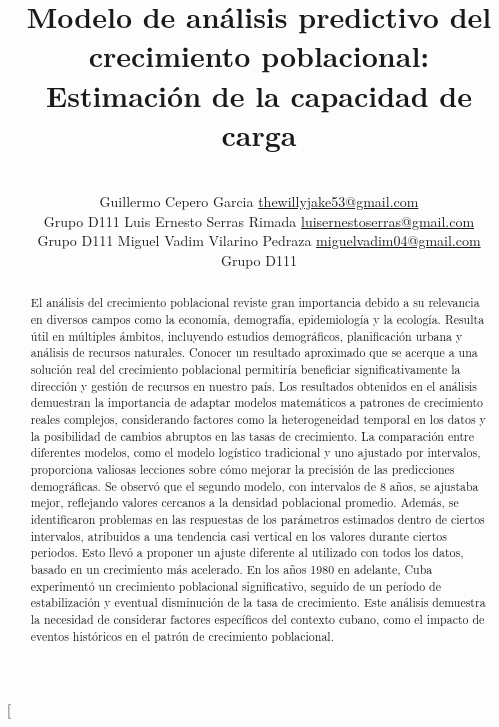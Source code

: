 \documentclass[a4paper,10pt,twocolumn]{article}
\title{Modelo de análisis predictivo del crecimiento poblacional: Estimación de la capacidad de carga}
\author{\\
\name Guillermo Cepero Garcia \email \href{mailto:thewillyjake53@gmail.com}{thewillyjake53@gmail.com}
	\\ \addr Grupo D111 \AND
\name Luis Ernesto Serras Rimada \email \href{mailto:luisernestoserras@gmail.com}{luisernestoserras@gmail.com}
  \\ \addr Grupo D111 \AND
\name Miguel Vadim Vilarino Pedraza \email \href{mailto:miguelvadim04@gmail.com}{miguelvadim04@gmail.com}
	\\ \addr Grupo D111}
\begin{document}
\twocolumn[

\maketitle


\begin{abstract}

	El análisis del crecimiento poblacional reviste gran importancia debido a su relevancia en diversos campos como la economía, demografía, epidemiología y la ecología. Resulta útil en múltiples ámbitos, incluyendo estudios demográficos, planificación urbana y análisis de recursos naturales. Conocer un resultado aproximado que se acerque a una solución real del crecimiento poblacional permitiría beneficiar significativamente la dirección y gestión de recursos en nuestro país. Los resultados obtenidos en el análisis demuestran la importancia de adaptar modelos matemáticos a patrones de crecimiento reales complejos, considerando factores como la heterogeneidad temporal en los datos y la posibilidad de cambios abruptos en las tasas de crecimiento. La comparación entre diferentes modelos, como el modelo logístico tradicional y uno ajustado por intervalos, proporciona valiosas lecciones sobre cómo mejorar la precisión de las predicciones demográficas. Se observó que el segundo modelo, con intervalos de 8 años, se ajustaba mejor, reflejando valores cercanos a la densidad poblacional promedio. Además, se identificaron problemas en las respuestas de los parámetros estimados dentro de ciertos intervalos, atribuidos a una tendencia casi vertical en los valores durante ciertos periodos. Esto llevó a proponer un ajuste diferente al utilizado con todos los datos, basado en un crecimiento más acelerado. En los años 1980 en adelante, Cuba experimentó un crecimiento poblacional significativo, seguido de un período de estabilización y eventual disminución de la tasa de crecimiento. Este análisis demuestra la necesidad de considerar factores específicos del contexto cubano, como el impacto de eventos históricos en el patrón de crecimiento poblacional.

\end{abstract}
\end{document}

